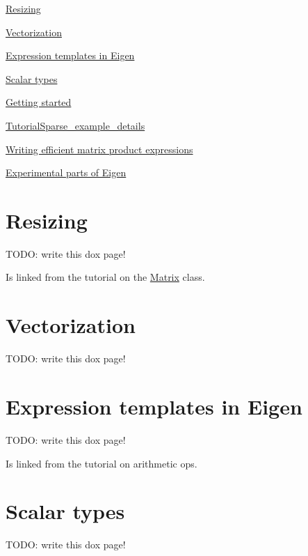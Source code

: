 
\begin{DoxyItemize}
\item \hyperlink{TopicResizing}{Resizing}
\item \hyperlink{TopicVectorization}{Vectorization}
\item \hyperlink{TopicEigenExpressionTemplates}{Expression templates in Eigen}
\item \hyperlink{TopicScalarTypes}{Scalar types}
\item \hyperlink{GettingStarted}{Getting started}
\item \hyperlink{_tutorial_sparse_example_details}{Tutorial\+Sparse\+\_\+example\+\_\+details}
\item \hyperlink{TopicWritingEfficientProductExpression}{Writing efficient matrix product expressions}
\item \hyperlink{Experimental}{Experimental parts of Eigen} 
\end{DoxyItemize}\hypertarget{TopicResizing}{}\section{Resizing}\label{TopicResizing}
T\+O\+DO\+: write this dox page!

Is linked from the tutorial on the \hyperlink{group___core___module_class_eigen_1_1_matrix}{Matrix} class. \hypertarget{TopicVectorization}{}\section{Vectorization}\label{TopicVectorization}
T\+O\+DO\+: write this dox page! \hypertarget{TopicEigenExpressionTemplates}{}\section{Expression templates in Eigen}\label{TopicEigenExpressionTemplates}
T\+O\+DO\+: write this dox page!

Is linked from the tutorial on arithmetic ops. \hypertarget{TopicScalarTypes}{}\section{Scalar types}\label{TopicScalarTypes}
T\+O\+DO\+: write this dox page!

